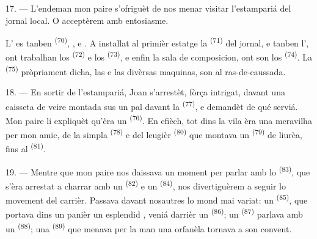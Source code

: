 \VUsaut{3.0mm}

17. --- L'endeman mon paire s'ofriguèt de nos menar visitar l'estampariá del
jornal local. O acceptèrem amb entosiasme.

L' es tanben  \textsuperscript{(70)},
,  e . A installat al primièr
estatge la  \textsuperscript{(71)} del jornal, e tanben
l', ont trabalhan los 
\textsuperscript{(72)} e los  \textsuperscript{(73)},
e enfin la sala de composicion, ont son los 
\textsuperscript{(74)}. La  \textsuperscript{(75)}
pròpriament dicha, las  e las divèrsas maquinas, son al
ras-de-caussada.

\VUsaut{3.0mm}

18. --- En sortir de l'estampariá, Joan s'arrestèt, fòrça intrigat, davant una
caisseta de veire montada sus un pal davant la 
\textsuperscript{(77)}, e demandèt de qué serviá. Mon paire li expliquèt qu'èra un
 \textsuperscript{(76)}. En efièch, tot dins la vila
èra una meravilha per mon amic, de la simpla 
\textsuperscript{(78)} e del leugièr 
\textsuperscript{(80)} que montava un  \textsuperscript{(79)} de
liurèa, fins al  \textsuperscript{(81)}.

19. --- Mentre que mon paire nos daissava un moment per parlar amb lo
 \textsuperscript{(83)}, que s'èra arrestat a
charrar amb un  \textsuperscript{(82)} e un 
\textsuperscript{(84)}, nos divertiguèrem a seguir lo movement del carrièr.
Passava davant nosautres lo mond mai variat: un 
\textsuperscript{(85)}, que portava dins un panièr un esplendid ,
veniá darrièr un  \textsuperscript{(86)}; un
 \textsuperscript{(87)} parlava amb un 
\textsuperscript{(88)}; una  \textsuperscript{(89)} que menava per
la man una orfanèla tornava a son convent.

\VUsaut{3.0mm}

